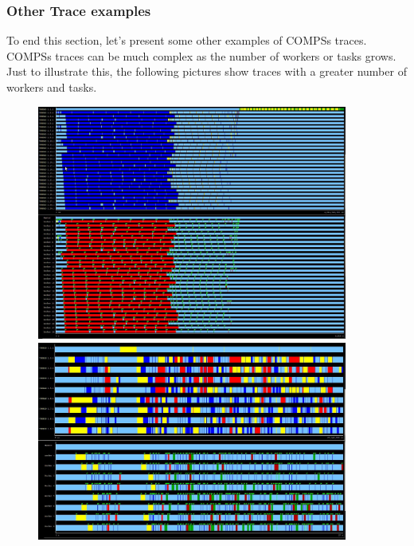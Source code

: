 \subsubsection{Other Trace examples}

To end this section, let’s present some other examples of COMPSs traces. COMPSs traces can be much complex as the number of workers or tasks grows. Just to illustrate this, the following pictures show traces with a greater number of workers and tasks.

\begin{figure}[ht!]
  \centering
    \includegraphics[width=0.91\textwidth]{./Sections/7_Tracing/Figures/16.jpeg}
    \includegraphics[width=0.91\textwidth]{./Sections/7_Tracing/Figures/16_2.jpeg}
\end{figure}

